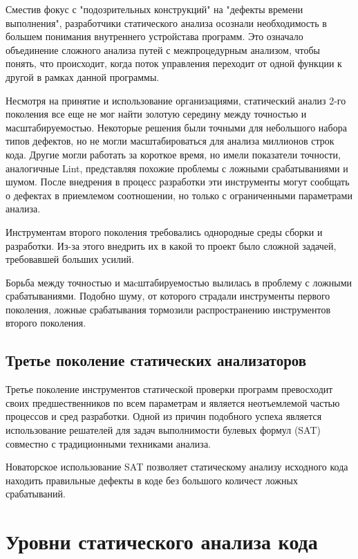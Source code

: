Сместив фокус с "подозрительных конструкций" на "дефекты времени выполнения", разработчики 
статического анализа осознали необходимость в большем понимания внутреннего 
устройстава программ. Это означало объединение сложного анализа путей с межпроцедурным анализом, 
чтобы понять, что происходит, когда поток управления переходит от одной функции к другой в 
рамках данной программы.

Несмотря на принятие и использование организациями, статический анализ 2-го поколения все еще 
не мог найти золотую середину между точностью и масштабируемостью. Некоторые решения были 
точными для небольшого набора типов дефектов, но не могли масштабироваться для анализа 
миллионов строк кода. Другие могли работать за короткое время, но имели показатели точности, 
аналогичные Lint, представляя похожие проблемы с ложными срабатываниями и шумом. После 
внедрения в процесс разработки эти инструменты могут сообщать о дефектах в приемлемом 
соотношении, но только с ограниченными параметрами анализа. 

Инструментам второго поколения требовались однородные среды сборки и разработки. 
Из-за этого внедрить их в какой то проект было сложной задачей, требовавшей больших усилий.

Борьба между точностью и маcштабируемостью вылилась в проблему с ложными срабатываниями. Подобно 
шуму, от которого страдали инструменты первого поколения, ложные срабатывания тормозили 
распространению инструментов второго поколения. 

\subsection{Третье поколение статических анализаторов}
Третье поколение инструментов статической проверки программ превосходит своих предшественников по
всем параметрам и является неотъемлемой частью процессов и сред разработки. Одной из причин подобного успеха является использование решателей для
задач выполнимости булевых формул (SAT) совместно с традиционными техниками анализа. \cite{}

Новаторское использование SAT позволяет статическому анализу исходного кода находить правильные дефекты 
в коде без большого количест ложных срабатываний.

\section{Уровни статического анализа кода}

